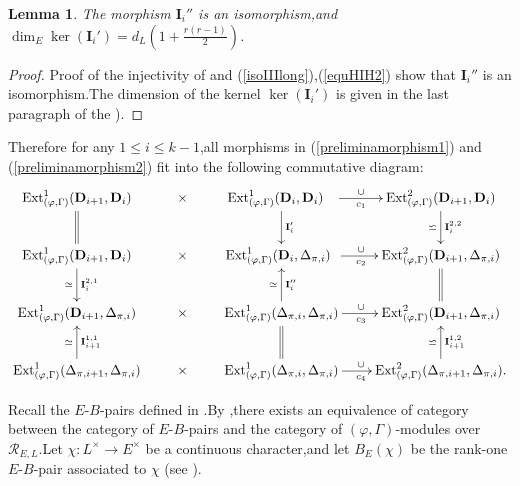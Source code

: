 \documentclass[SecEq,CM,GP]{degruyter-crelle} %
\theoremstyle{plain}
\newtheorem{lem}[thm]{Lemma}
\newcommand{\Dpik}{{\mathbf{D}}}
\newcommand{\ext}{{\rm Ext}}
\newcommand{\cR}{\mathcal R}
\begin{document}
\begin{lem}\label{deformationker}The morphism $\mathbf{I}_{i}''$ is an isomorphism,\;and $\dim_E\ker(\mathbf{I}_{i}')=d_L(1+\frac{r(r-1)}{2})$.\;
\end{lem}
\begin{proof}Proof of the injectivity of  \cite[ Proposition 4.1.4,\;(4.10)]{Ding2021} and  (\ref{isoIIIlong}),\;(\ref{equHIH2}) show that $\mathbf{I}_{i}''$ is an isomorphism.\;The dimension of the kernel $\ker(\mathbf{I}_{i}')$ is given in the last paragraph of the \cite[Proof of Proposition 4.1.4]{Ding2021}).\;
\end{proof}

Therefore for any $1\leq i\leq k-1$,\;all morphisms in (\ref{preliminamorphism1}) and (\ref{preliminamorphism2}) fit into the following commutative diagram:
\begin{equation}\label{bigcommutediag}
\xymatrix@C=5ex{
	\ext^1_{(\varphi,\Gamma)}(\Dpik_{i+1},\Dpik_{i}) \ar@{=}[d]                        & \times & \ext^1_{(\varphi,\Gamma)}(\Dpik_{i},\Dpik_{i})\hspace{9pt} \ar[d]^{\mathbf{I}_{i}'}         \ar[r]^{\cup}_{c_1}
	& \ext^2_{(\varphi,\Gamma)}(\Dpik_{i+1},\Dpik_{i}) \ar[d]_{\backsimeq}^{\mathbf{I}_{i}^{2,2}} \\
	\ext^1_{(\varphi,\Gamma)}(\Dpik_{i+1},\Dpik_{i}) \ar[d]^{\mathbf{I}_{i}^{2,1}}_{\simeq}             & \times & \ext^1_{(\varphi,\Gamma)}(\Dpik_{i},\Delta_{\pi,i})\hspace{5pt}                 \ar[r]^{\cup}_{c_2}
	& \ext^2_{(\varphi,\Gamma)}(\Dpik_{i+1},\Delta_{\pi,i}) \ar@{=}[d]           \\
	\ext^1_{(\varphi,\Gamma)}(\Dpik_{i+1},\Delta_{\pi,i})                             & \times & \ext^1_{(\varphi,\Gamma)}(\Delta_{\pi,i},\Delta_{\pi,i})\ar[u]_{\mathbf{I}_{i}''}^{\simeq}  \ar[r]^{\cup}_{c_3}
	&\ext^2_{(\varphi,\Gamma)}(\Dpik_{i+1},\Delta_{\pi,i})                       \\
	\ext^1_{(\varphi,\Gamma)}(\Delta_{\pi,i+1},\Delta_{\pi,i}) \ar[u]_{\mathbf{I}_{i+1}^{1,1}}^{\simeq}  & \times & \ext^1_{(\varphi,\Gamma)}(\Delta_{\pi,i},\Delta_{\pi,i}) \ar@{=}[u]            \ar[r]^{\cup}_{c_4}
	&\ext^2_{(\varphi,\Gamma)}(\Delta_{\pi,i+1},\Delta_{\pi,i}) \ar[u]^{\backsimeq}_{\mathbf{I}_{i+1}^{1,2}}.}
\end{equation}

Recall the $E$-$B$-pairs defined in \cite{nakamura2009classification}.\;By \cite[Theorem 1.36]{nakamura2009classification},\;there exists an equivalence of category between the category of $E$-$B$-pairs and  the category of $(\varphi,\Gamma)$-modules over $\cR_{E,L}$.\;Let $\chi:L^\times\rightarrow E^\times$ be a continuous character,\;and let $B_E(\chi)$ be the rank-one $E$-$B$-pair associated to $\chi$ (see \cite[Theorem 1.45]{nakamura2009classification}).\;
\end{document}
